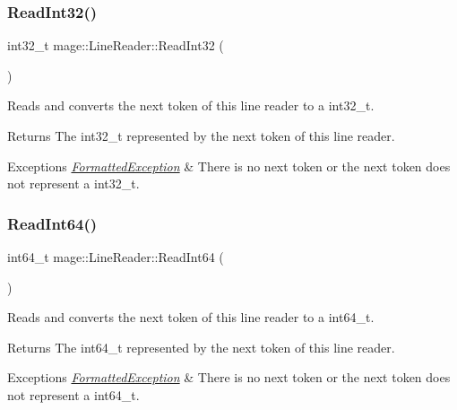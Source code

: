 \subsubsection{\texorpdfstring{Read\+Int32()}{ReadInt32()}}
{\footnotesize\ttfamily int32\+\_\+t mage\+::\+Line\+Reader\+::\+Read\+Int32 (\begin{DoxyParamCaption}{ }\end{DoxyParamCaption})\hspace{0.3cm}{\ttfamily [protected]}}

Reads and converts the next token of this line reader to a {\ttfamily int32\+\_\+t}.

\begin{DoxyReturn}{Returns}
The {\ttfamily int32\+\_\+t} represented by the next token of this line reader. 
\end{DoxyReturn}

\begin{DoxyExceptions}{Exceptions}
{\em \hyperlink{structmage_1_1_formatted_exception}{Formatted\+Exception}} & There is no next token or the next token does not represent a {\ttfamily int32\+\_\+t}. \\
\hline
\end{DoxyExceptions}
\hypertarget{classmage_1_1_line_reader_af78e657c17cfff3bfc5fed42fbc47085}{}\label{classmage_1_1_line_reader_af78e657c17cfff3bfc5fed42fbc47085} 
\subsubsection{\texorpdfstring{Read\+Int64()}{ReadInt64()}}
{\footnotesize\ttfamily int64\+\_\+t mage\+::\+Line\+Reader\+::\+Read\+Int64 (\begin{DoxyParamCaption}{ }\end{DoxyParamCaption})\hspace{0.3cm}{\ttfamily [protected]}}

Reads and converts the next token of this line reader to a {\ttfamily int64\+\_\+t}.

\begin{DoxyReturn}{Returns}
The {\ttfamily int64\+\_\+t} represented by the next token of this line reader. 
\end{DoxyReturn}

\begin{DoxyExceptions}{Exceptions}
{\em \hyperlink{structmage_1_1_formatted_exception}{Formatted\+Exception}} & There is no next token or the next token does not represent a {\ttfamily int64\+\_\+t}. \\
\hline
\end{DoxyExceptions}
\hypertarget{classmage_1_1_line_reader_a3b88ec3a8555d79b25c2a8818a26f124}{}\label{classmage_1_1_line_reader_a3b88ec3a8555d79b25c2a8818a26f124} 

